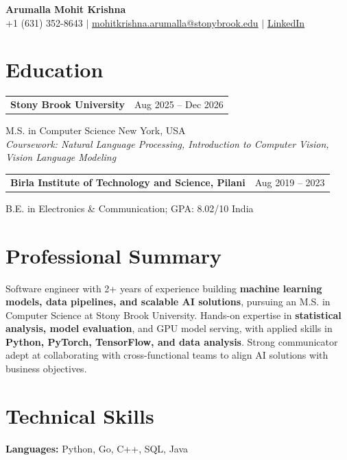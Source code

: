 \documentclass[letterpaper,10pt]{article}
\makeatletter
\newcommand{\entry}[2]{%
  \noindent
  \begin{tabularx}{\linewidth}
    {@{}>{\raggedright\arraybackslash}X@{\hspace{6pt}}r@{}}
    \textbf{#1} & #2
  \end{tabularx}\par
}
\makeatother
\begin{document}
\begin{center}
    {\LARGE\bfseries Arumalla Mohit Krishna}\\[3pt]
    +1 (631) 352-8643 $|$
    \href{mailto:mohitkrishna.arumalla@stonybrook.edu}
    {mohitkrishna.arumalla@stonybrook.edu} $|$
    \href{https://linkedin.com/in/mohit-krishna-arumalla}
    {LinkedIn}
\end{center}
\vspace{-8pt}

\section{Education}

\entry
  {\textbf{Stony Brook University}}
  {Aug 2025 -- Dec 2026}

M.S. in Computer Science \hfill New York, USA\\
\textit{Coursework: Natural Language Processing, Introduction to Computer Vision, Vision Language Modeling}

\vspace{3pt}

\entry
  {\textbf{Birla Institute of Technology and Science, Pilani}}
  {Aug 2019 -- 2023}

B.E. in Electronics \& Communication; GPA: 8.02/10 \hfill India

\section{Professional Summary}

Software engineer with 2+ years of experience building \textbf{machine learning models, data pipelines, and scalable AI solutions}, pursuing an M.S. in Computer Science at Stony Brook University. Hands-on expertise in \textbf{statistical analysis, model evaluation}, and GPU model serving, with applied skills in \textbf{Python, PyTorch, TensorFlow, and data analysis}. Strong communicator adept at collaborating with cross-functional teams to align AI solutions with business objectives.

\section{Technical Skills}

\textbf{Languages:} Python, Go, C++, SQL, Java\\
\end{document}
